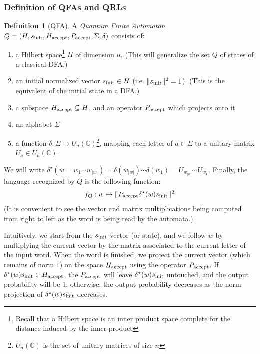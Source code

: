 \documentclass[12pt,a4paper]{article}
\theoremstyle{plain}
\theoremstyle{definition}
\newtheorem*{definition}{Definition}
\begin{document}
\subsubsection{Definition of QFAs and QRLs}
\begin{definition}[QFA]
    A \emph{Quantum Finite Automaton} $Q=(H, s_{\textnormal{init}}, H_{\textnormal{accept}}, P_{\textnormal{accept}}, \Sigma, \delta)$ consists of:
    \begin{enumerate}[label=--, noitemsep]
        \item a Hilbert space\footnote{Recall that a Hilbert space is an inner product space complete for the distance induced by the inner product} $H$ of dimension $n$. (This will generalize the set $Q$ of states of a classical DFA.)
        \item an initial normalized vector $s_{\textnormal{init}}\in H$ (i.e. $\|s_{\textnormal{init}}\|^2=1$). (This is the equivalent of the initial state in a DFA.)
        \item a subspace $H_{\textnormal{accept}} \subseteq H$, and an operator $P_{\textnormal{accept}}$ which projects onto it
        \item an alphabet $\Sigma$
        \item a function $\delta : \Sigma \to U_n(\mathbb{C})$\footnote{$U_n(\mathbb{C})$ is the set of unitary matrices of size $n$}, mapping each letter of $a\in\Sigma$ to a unitary matrix $U_a\in U_n(\mathbb{C})$.
    \end{enumerate}
    
    We will write $\delta^\star(w=w_1\cdots w_{|w|}) = \delta(w_{|w|})\cdots \delta(w_1) = U_{w_{|w|}}\cdots U_{w_1}$. Finally, the language recognized by $Q$ is the following function:
    \begin{equation*}
        f_Q : w \mapsto \|P_{\textnormal{accept}}\delta^\star(w)s_{\textnormal{init}}\|^2
    \end{equation*}
    (It is convenient to see the vector and matrix multiplications being computed from right to left as the word is being read by the automata.)
\end{definition}

Intuitively, we start from the $s_{\textnormal{init}}$ vector (or state), and we follow $w$ by multiplying the current vector by the matrix associated to the current letter of the input word. When the word is finished, we project the current vector (which remains of norm $1$) on the space $H_{\textnormal{accept}}$ using the operator $P_{\textnormal{accept}}$. If $\delta^\star(w)s_{\textnormal{init}}\in H_{\textnormal{accept}}$, the $P_{\textnormal{accept}}$ will leave $\delta^\star(w)s_{\textnormal{init}}$ untouched, and the output probability will be $1$; otherwise, the output probability decreases as the norm projection of $\delta^\star(w)s_{\textnormal{init}}$ decreases.
\end{document}

